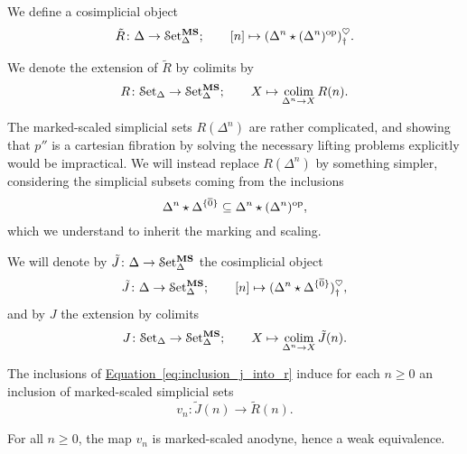 \documentclass[main.tex]{subfiles}
\begin{document}
\begin{definition}
  \label{def:cosimplicial_obj_R}
  We define a cosimplicial object
  \begin{equation*}
    \tilde{R}\colon \Delta \to \mathcal{S}\mathrm{et}_{\Delta}^{\mathbf{MS}};\qquad [n] \mapsto (\Delta^{n} \star (\Delta^{n})^{\mathrm{op}})^{\heartsuit}_{\dagger}.
  \end{equation*}

  We denote the extension of $\tilde{R}$ by colimits by
  \begin{equation*}
    R\colon \mathcal{S}\mathrm{et}_{\Delta} \to \mathcal{S}\mathrm{et}_{\Delta}^{\mathbf{MS}};\qquad X \mapsto \operatorname*{colim}_{\Delta^{n} \to X} R(n).
  \end{equation*}
\end{definition}

The marked-scaled simplicial sets $R(\Delta^{n})$ are rather complicated, and showing that $p''$ is a cartesian fibration by solving the necessary lifting problems explicitly would be impractical. We will instead replace $R(\Delta^{n})$ by something simpler, considering the simplicial subsets coming from the inclusions
\begin{equation}
  \label{eq:inclusion_j_into_r}
  \Delta^{n} \star \Delta^{\{\overline{0}\}} \subseteq \Delta^{n} \star (\Delta^{n})^{\mathrm{op}},
\end{equation}
which we understand to inherit the marking and scaling.

\begin{definition}
  \label{def:cosimplicial_obj_J}
  We will denote by $\tilde{J}\colon \Delta \to \mathcal{S}\mathrm{et}_{\Delta}^{\mathbf{MS}}$ the cosimplicial object
  \begin{equation*}
    \tilde{J}\colon \Delta \to \mathcal{S}\mathrm{et}_{\Delta}^{\mathbf{MS}};\qquad [n] \mapsto (\Delta^{n} \star \Delta^{\{\overline{0}\}})^{\heartsuit}_{\dagger},
  \end{equation*}
  and by $J$ the extension by colimits
  \begin{equation*}
    J\colon \mathcal{S}\mathrm{et}_{\Delta} \to \mathcal{S}\mathrm{et}_{\Delta}^{\mathbf{MS}};\qquad X \mapsto \operatorname*{colim}_{\Delta^{n} \to X} \tilde{J}(n).
  \end{equation*}
\end{definition}

The inclusions of \hyperref[eq:inclusion_j_into_r]{Equation~\ref*{eq:inclusion_j_into_r}} induce for each $n \geq 0$ an inclusion of marked-scaled simplicial sets
\begin{equation*}
  v_{n}\colon \tilde{J}(n) \to \tilde{R}(n).
\end{equation*}

\begin{lemma}
  \label{lemma:lower_morphism_equivalence}
  For all $n \geq 0$, the map $v_{n}$ is marked-scaled anodyne, hence a weak equivalence.
\end{lemma}
\end{document}
